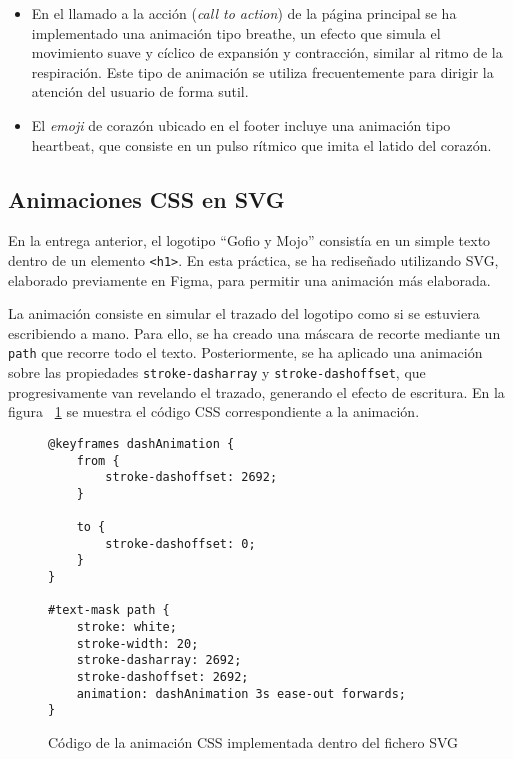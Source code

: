 \documentclass{article}
\begin{document}
\begin{itemize}
    \item En el llamado a la acción (\textit{call to action}) de la página principal se ha implementado una animación tipo breathe, un efecto que simula el movimiento suave y cíclico de expansión y contracción, similar al ritmo de la respiración. Este tipo de animación se utiliza frecuentemente para dirigir la atención del usuario de forma sutil.

    \item El \textit{emoji} de corazón ubicado en el footer incluye una animación tipo heartbeat, que consiste en un pulso rítmico que imita el latido del corazón.
\end{itemize}

\subsection{Animaciones CSS en SVG}\label{subsec:animaciones-en-svg}

En la entrega anterior, el logotipo ``Gofio y Mojo'' consistía en un simple texto dentro de un elemento \texttt{<h1>}. En esta práctica, se ha rediseñado utilizando SVG, elaborado previamente en Figma, para permitir una animación más elaborada.

La animación consiste en simular el trazado del logotipo como si se estuviera escribiendo a mano. Para ello, se ha creado una máscara de recorte mediante un \texttt{path} que recorre todo el texto. Posteriormente, se ha aplicado una animación sobre las propiedades \texttt{stroke-dasharray} y \texttt{stroke-dashoffset}, que progresivamente van revelando el trazado, generando el efecto de escritura. En la figura ~\ref{fig:svg-animation} se muestra el código CSS correspondiente a la animación.

\begin{figure}[h!]
\begin{verbatim}
@keyframes dashAnimation {
    from {
        stroke-dashoffset: 2692;
    }

    to {
        stroke-dashoffset: 0;
    }
}

#text-mask path {
    stroke: white;
    stroke-width: 20;
    stroke-dasharray: 2692;
    stroke-dashoffset: 2692;
    animation: dashAnimation 3s ease-out forwards;
}
\end{verbatim}
\caption{Código de la animación CSS implementada dentro del fichero SVG}
\label{fig:svg-animation}
\end{figure}
\end{document}
